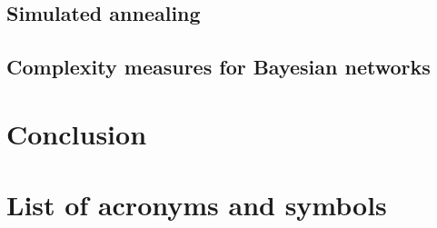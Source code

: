 \documentclass[a4paper, twoside, 11pt]{report}
\theoremstyle{plain}
\theoremstyle{definition}
\theoremstyle{remark}
\begin{document}
\section{Simulated annealing}
\section{Complexity measures for Bayesian networks}

\chapter{Conclusion}

\newpage
\chapter*{List of acronyms and symbols}
\printglossaries



\end{document}
